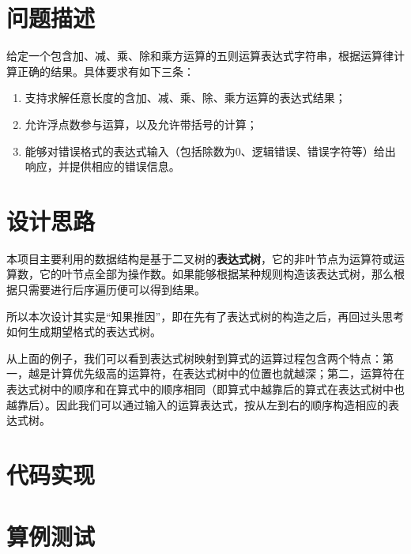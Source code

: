
\section{问题描述}
给定一个包含加、减、乘、除和乘方运算的五则运算表达式字符串，根据运算律计算正确的结果。具体要求有如下三条：

\begin{enumerate}
\item 支持求解任意长度的含加、减、乘、除、乘方运算的表达式结果；
\item 允许浮点数参与运算，以及允许带括号的计算；
\item 能够对错误格式的表达式输入（包括除数为0、逻辑错误、错误字符等）给出响应，并提供相应的错误信息。
\end{enumerate}

\section{设计思路}

本项目主要利用的数据结构是基于二叉树的\textbf{表达式树}，它的非叶节点为运算符或运算数，它的叶节点全部为操作数。如果能够根据某种规则构造该表达式树，那么根据只需要进行后序遍历便可以得到结果。

所以本次设计其实是“知果推因”，即在先有了表达式树的构造之后，再回过头思考如何生成期望格式的表达式树。


从上面的例子，我们可以看到表达式树映射到算式的运算过程包含两个特点：第一，越是计算优先级高的运算符，在表达式树中的位置也就越深；第二，运算符在表达式树中的顺序和在算式中的顺序相同（即算式中越靠后的算式在表达式树中也越靠后）。因此我们可以通过输入的运算表达式，按从左到右的顺序构造相应的表达式树。

\section{代码实现}

\section{算例测试}
